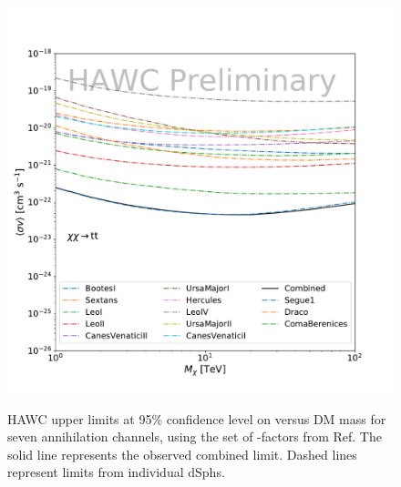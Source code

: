 \begin{figure}[ht]
{    \includegraphics[scale=0.21]{figures/glory_duck/hawc/Combined95_GD_tt.pdf}
    }
    \caption{HAWC upper limits at 95\% confidence level on \sv versus DM mass for seven annihilation channels, using the set of \J-factors from Ref. \cite{Geringer-Sameth:2014yza} The solid line represents the observed combined limit. Dashed lines represent limits from individual dSphs.}
 \label{fig:hawc_combined_limit}
\end{figure}

